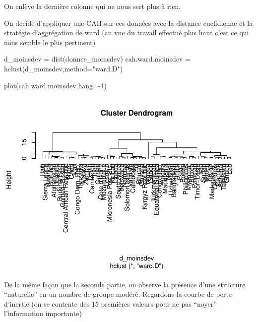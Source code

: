 \documentclass[
]{article}
\newenvironment{Shaded}{}{}
\newcommand{\AttributeTok}[1]{#1}
\newcommand{\DecValTok}[1]{#1}
\newcommand{\FunctionTok}[1]{#1}
\newcommand{\NormalTok}[1]{#1}
\newcommand{\OtherTok}[1]{\textcolor[rgb]{1.00,0.25,0.00}{#1}}
\newcommand{\SpecialCharTok}[1]{\textcolor[rgb]{0.00,0.50,0.50}{#1}}
\newcommand{\StringTok}[1]{\textcolor[rgb]{0.00,0.50,0.50}{#1}}
\begin{document}
On enlève la dernière colonne qui ne nous sert plus à rien.

On decide d'appliquer une CAH sur ces données avec la distance
euclidienne et la stratégie d'aggrégation de ward (au vue du travail
effectué plus haut c'est ce qui nous semble le plus pertinent)

\begin{Shaded}
\begin{Highlighting}[]
\NormalTok{d\_moinsdev }\OtherTok{=} \FunctionTok{dist}\NormalTok{(donnee\_moinsdev)}
\NormalTok{cah.ward.moinsdev }\OtherTok{=} \FunctionTok{hclust}\NormalTok{(d\_moinsdev,}\AttributeTok{method=}\StringTok{"ward.D"}\NormalTok{)}

\FunctionTok{plot}\NormalTok{(cah.ward.moinsdev,}\AttributeTok{hang=}\SpecialCharTok{{-}}\DecValTok{1}\NormalTok{)}
\end{Highlighting}
\end{Shaded}

\includegraphics{Projet_files/figure-latex/unnamed-chunk-31-1.pdf}

De la même façon que la seconde partie, on observe la présence d'une
structure ``naturelle'' en un nombre de groupe modéré. Regardons la
courbe de perte d'inertie (on se contente des 15 premières valeurs pour
ne pas ``noyer'' l'information importante)

\begin{Shaded}
\end{Shaded}
\end{document}
